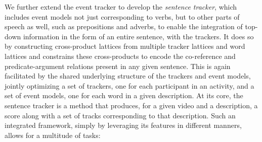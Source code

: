 We further extend the event tracker to develop the \emph{sentence tracker},
which includes event models not just corresponding to verbs, but to other
parts of speech as well, such as prepositions and adverbs, to enable the
integration of top-down information in the form of an entire sentence, with
the trackers.
%
It does so by constructing cross-product lattices from multiple tracker
lattices and word lattices and constrains these cross-products to encode the
co-reference and predicate-argument relations present in any given sentence.
%
This is again facilitated by the shared underlying structure of the trackers
and event models, jointly optimizing a set of trackers, one for each
participant in an activity, and a set of event models, one for each word in a
given description.
%
At its core, the sentence tracker is a method that produces, for a given
video and a description, a score along with a set of tracks corresponding to
that description.
%
Such an integrated framework, simply by leveraging its features in different
manners, allows for a multitude of tasks:
%
